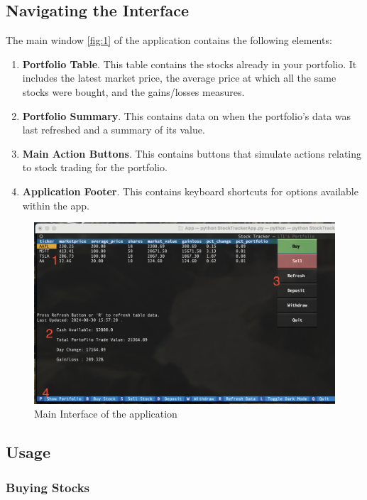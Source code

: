 \documentclass{article}
\begin{document}
\subsection{Navigating the Interface}

The main window \autoref{fig:1} of the application contains the following elements:
\begin{enumerate}
    \item \textbf{Portfolio Table}. This table contains the stocks already in your portfolio. It includes the latest market price, the average price at which all the same stocks were bought, and the gains/losses measures.
    \item \textbf{Portfolio Summary}. This contains data on when the portfolio's data was last refreshed and a summary of its value.
    \item \textbf{Main Action Buttons}. This contains buttons that simulate actions relating to stock trading for the portfolio. 
    \item \textbf{Application Footer}. This contains keyboard shortcuts for options available within the app. 
\end{enumerate}

\begin{figure}
    \centering
    \includegraphics[width=1\linewidth]{MainWindow.png}
    \caption{Main Interface of the application}
    \label{fig:1}
\end{figure}

\subsection{Usage}

\subsubsection{Buying Stocks}
\end{document}
